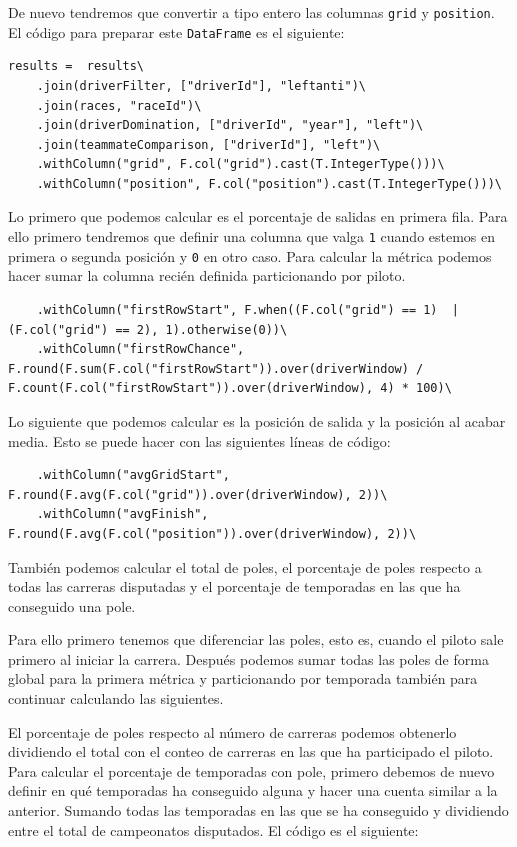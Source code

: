 \documentclass[12pt,twoside,titlepage]{report}
\begin{document}
De nuevo tendremos que convertir a tipo entero las columnas \texttt{grid} y \texttt{position}. El código para preparar este \texttt{DataFrame} es el siguiente:

\begin{lstlisting}
results =  results\
	.join(driverFilter, ["driverId"], "leftanti")\
	.join(races, "raceId")\
	.join(driverDomination, ["driverId", "year"], "left")\
	.join(teammateComparison, ["driverId"], "left")\
	.withColumn("grid", F.col("grid").cast(T.IntegerType()))\
	.withColumn("position", F.col("position").cast(T.IntegerType()))\
\end{lstlisting}

Lo primero que podemos calcular es el porcentaje de salidas en primera fila. Para ello primero tendremos que definir una columna que valga \texttt{1} cuando estemos en primera o segunda posición y \texttt{0} en otro caso. Para calcular la métrica podemos hacer sumar la columna recién definida particionando por piloto.

\begin{lstlisting}
	.withColumn("firstRowStart", F.when((F.col("grid") == 1)  | (F.col("grid") == 2), 1).otherwise(0))\
	.withColumn("firstRowChance", F.round(F.sum(F.col("firstRowStart")).over(driverWindow) / F.count(F.col("firstRowStart")).over(driverWindow), 4) * 100)\
\end{lstlisting}

Lo siguiente que podemos calcular es la posición de salida y la posición al acabar media. Esto se puede hacer con las siguientes líneas de código:

\begin{lstlisting}
	.withColumn("avgGridStart", F.round(F.avg(F.col("grid")).over(driverWindow), 2))\
	.withColumn("avgFinish", F.round(F.avg(F.col("position")).over(driverWindow), 2))\
\end{lstlisting}

También podemos calcular el total de poles, el porcentaje de poles respecto a todas las carreras disputadas y el porcentaje de temporadas en las que ha conseguido una pole.

Para ello primero tenemos que diferenciar las poles, esto es, cuando el piloto sale primero al iniciar la carrera. Después podemos sumar todas las poles de forma global para la primera métrica y particionando por temporada también para continuar calculando las siguientes.

El porcentaje de poles respecto al número de carreras podemos obtenerlo dividiendo el total con el conteo de carreras en las que ha participado el piloto. Para calcular el porcentaje de temporadas con pole, primero debemos de nuevo definir en qué temporadas ha conseguido alguna y hacer una cuenta similar a la anterior. Sumando todas las temporadas en las que se ha conseguido y dividiendo entre el total de campeonatos disputados. El código es el siguiente:
\end{document}
